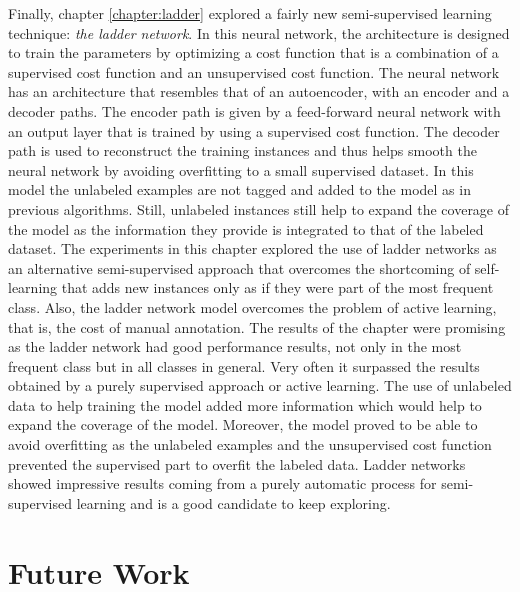 Finally, chapter \ref{chapter:ladder} explored a fairly new semi-supervised
learning technique: {\em the ladder network}. In this neural network, the
architecture is designed to train the parameters by optimizing a cost function
that is a combination of a supervised cost function and an unsupervised cost
function. The neural network has an architecture that resembles that of an
autoencoder, with an encoder and a decoder paths. The encoder path is given by
a feed-forward neural network with an output layer that is trained by using a
supervised cost function. The decoder path is used to reconstruct the training
instances and thus helps smooth the neural network by avoiding overfitting to a
small supervised dataset. In this model the unlabeled examples are not tagged
and added to the model as in previous algorithms. Still, unlabeled instances
still help to expand the coverage of the model as the information they provide
is integrated to that of the labeled dataset. The experiments in this chapter
explored the use of ladder networks as an alternative semi-supervised approach
that overcomes the shortcoming of self-learning that adds new instances only as
if they were part of the most frequent class. Also, the ladder network model
overcomes the problem of active learning, that is, the cost of manual
annotation. The results of the chapter were promising as the ladder network had
good performance results, not only in the most frequent class but in all
classes in general. Very often it surpassed the results obtained by a purely
supervised approach or active learning. The use of unlabeled data to help
training the model added more information which would help to expand the
coverage of the model. Moreover, the model proved to be able to avoid
overfitting as the unlabeled examples and the unsupervised cost function
prevented the supervised part to overfit the labeled data. Ladder networks
showed impressive results coming from a purely automatic process for
semi-supervised learning and is a good candidate to keep exploring.

\section{Future Work}

